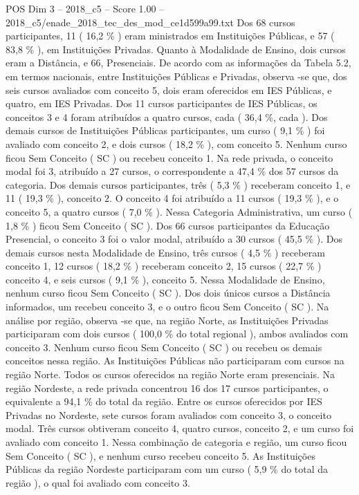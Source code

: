 \begin{textsample}{POS Dim 3 – 2018\_c5 – Score 1.00 – 2018\_c5/enade\_2018\_tec\_des\_mod\_ce1d599a99.txt}
Dos 68 cursos participantes, 11 ( 16,2 \% ) eram ministrados em Instituições Públicas, e 57 ( 83,8 \% ), em Instituições Privadas.
Quanto à Modalidade de Ensino, dois cursos eram a Distância, e 66, Presenciais.
De acordo com as informações da Tabela 5.2, em termos nacionais, entre Instituições Públicas e Privadas, observa -se que, dos seis cursos avaliados com conceito 5, dois eram oferecidos em IES Públicas, e quatro, em IES Privadas.
Dos 11 cursos participantes de IES Públicas, os conceitos 3 e 4 foram atribuídos a quatro cursos, cada ( 36,4 \%, cada ).
Dos demais cursos de Instituições Públicas participantes, um curso ( 9,1 \% ) foi avaliado com conceito 2, e dois cursos ( 18,2 \% ), com conceito 5.
Nenhum curso ficou Sem Conceito ( SC ) ou recebeu conceito 1.
Na rede privada, o conceito modal foi 3, atribuído a 27 cursos, o correspondente a 47,4 \% dos 57 cursos da categoria.
Dos demais cursos participantes, três ( 5,3 \% ) receberam conceito 1, e 11 ( 19,3 \% ), conceito 2.
O conceito 4 foi atribuído a 11 cursos ( 19,3 \% ), e o conceito 5, a quatro cursos ( 7,0 \% ).
Nessa Categoria Administrativa, um curso ( 1,8 \% ) ficou Sem Conceito ( SC ).
Dos 66 cursos participantes da Educação Presencial, o conceito 3 foi o valor modal, atribuído a 30 cursos ( 45,5 \% ).
Dos demais cursos nesta Modalidade de Ensino, três cursos ( 4,5 \% ) receberam conceito 1, 12 cursos ( 18,2 \% ) receberam conceito 2, 15 cursos ( 22,7 \% ) conceito 4, e seis cursos ( 9,1 \% ), conceito 5.
Nessa Modalidade de Ensino, nenhum curso ficou Sem Conceito ( SC ).
Dos dois únicos cursos a Distância informados, um recebeu conceito 3, e o outro ficou Sem Conceito ( SC ).
Na análise por região, observa -se que, na região Norte, as Instituições Privadas participaram com dois cursos ( 100,0 \% do total regional ), ambos avaliados com conceito 3.
Nenhum curso ficou Sem Conceito ( SC ) ou recebeu os demais conceitos nessa região.
As Instituições Públicas não participaram com cursos na região Norte.
Todos os cursos oferecidos na região Norte eram presenciais.
Na região Nordeste, a rede privada concentrou 16 dos 17 cursos participantes, o equivalente a 94,1 \% do total da região.
Entre os cursos oferecidos por IES Privadas no Nordeste, sete cursos foram avaliados com conceito 3, o conceito modal.
Três cursos obtiveram conceito 4, quatro cursos, conceito 2, e um curso foi avaliado com conceito 1.
Nessa combinação de categoria e região, um curso ficou Sem Conceito ( SC ), e nenhum curso recebeu conceito 5.
As Instituições Públicas da região Nordeste participaram com um curso ( 5,9 \% do total da região ), o qual foi avaliado com conceito 3.

\end{textsample}
